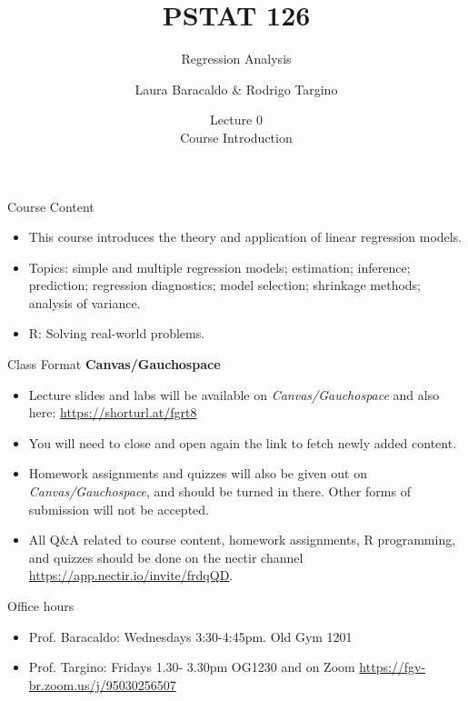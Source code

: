 \documentclass[10pt]{beamer}
\title[PSTAT 126: Regression Analysis]{PSTAT 126}%
\subtitle{Regression Analysis }%
\author[Laura Baracaldo \& Rodrigo Targino]{Laura Baracaldo \& Rodrigo Targino}%
\institute[UCSB]{}
\date[\textcolor{white}{Lecure 0: Course Introduction}]
{Lecture 0\\
Course Introduction}
\begin{document}
\frame{\titlepage}






\begin{frame}{Course Content}

\begin{itemize}
\large
    \item This course introduces the theory and application of linear regression models. 
    \item Topics: simple and multiple regression models; estimation; inference; prediction; regression diagnostics; model selection; shrinkage methods; analysis of variance. \item R: Solving real-world problems.
\end{itemize}

\end{frame}



\begin{frame}{Class Format}
\large
{\bf Canvas/Gauchospace}
\begin{itemize}

\item Lecture slides and labs will be available on {\em Canvas/Gauchospace} and also here:
\url{https://shorturl.at/fgrt8}
\item You will need to close and open again the link to fetch newly added content.
\item Homework assignments and quizzes will also be given out on {\em Canvas/Gauchospace}, and should be turned in there. Other forms of submission will not be accepted.
\item All Q\&A related to course content, homework assignments, R programming, and quizzes should
be done on the nectir channel \url{https://app.nectir.io/invite/frdqQD}.
\end{itemize}
\end{frame}

\begin{frame}{Office hours}
	\large
	\begin{itemize}
		\item Prof. Baracaldo: Wednesdays 3:30-4:45pm. Old Gym 1201
		\item Prof. Targino: Fridays 1.30- 3.30pm OG1230 and on Zoom \url{https://fgv-br.zoom.us/j/95030256507}
	\end{itemize}
\end{frame}
\end{document}
